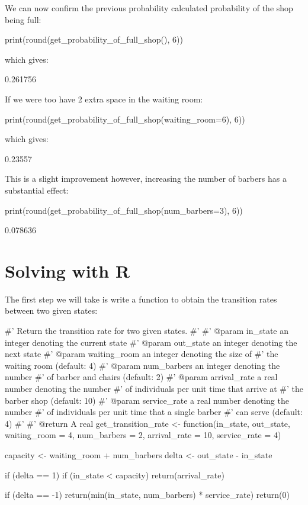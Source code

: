 We can now confirm the previous probability calculated probability of the shop
being full:

\begin{pyin}
print(round(get_probability_of_full_shop(), 6))
\end{pyin}

which gives:

\begin{pyout}
0.261756
\end{pyout}

If we were too have 2 extra space in the waiting room:

\begin{pyin}
print(round(get_probability_of_full_shop(waiting_room=6), 6))
\end{pyin}

which gives:

\begin{pyout}
0.23557
\end{pyout}

This is a slight improvement however, increasing the number of barbers has a
substantial effect:

\begin{pyin}
print(round(get_probability_of_full_shop(num_barbers=3), 6))
\end{pyin}

\begin{pyout}
0.078636
\end{pyout}
\section{Solving with R}\label{sec:solving-with-R}

The first step we will take is write a function to obtain the transition rates
between two given states:

\begin{Rin}
#' Return the transition rate for two given states.
#'
#' @param in_state an integer denoting the current state
#' @param out_state an integer denoting the next state
#' @param waiting_room an integer denoting the size of
#'        the waiting room (default: 4)
#' @param num_barbers an integer denoting the number
#'        of barber and chairs (default: 2)
#' @param arrival_rate a real number denoting the number
#'        of individuals per  unit time that arrive at
#'        the barber shop (default: 10)
#' @param service_rate a real number denoting the number
#'        of individuals per unit time that a single barber
#'        can serve (default: 4)
#'
#' @return A real
get_transition_rate <- function(in_state,
                                out_state,
                                waiting_room = 4,
                                num_barbers = 2,
                                arrival_rate = 10,
                                service_rate = 4) {
  capacity <- waiting_room + num_barbers
  delta <- out_state - in_state

  if (delta == 1) {
    if (in_state < capacity) {
      return(arrival_rate)
    }
  }

  if (delta == -1) {
    return(min(in_state, num_barbers) * service_rate)
  }
  return(0)
}
\end{Rin}

